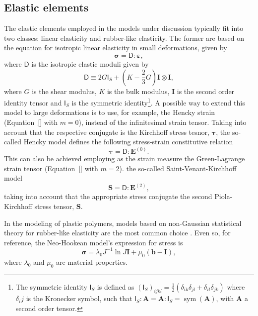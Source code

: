 \subsection{Elastic elements}

The elastic elements employed in the models under discussion typically fit into two classes: linear elasticity and rubber-like elasticity.
The former are based on the equation for isotropic linear elasticity in small deformations, given by
\begin{equation}
	\bm \sigma=\bm{\mathsf D}:\bm \varepsilon,
\end{equation}
where $\bm{\mathsf D}$ is the isotropic elastic moduli given by
\begin{equation}
\bm{\mathsf D}\equiv 2 G \bm{\mathsf I}_S+\left(K-\frac{2}{3} G\right) \mathbf I \otimes \mathbf I ,
\end{equation}
where $G$ is the shear modulus, $K$ is the bulk modulus, $\mathbf I$ is the second order identity tensor and $\bm{\mathsf I}_S$ is the symmetric identity\footnote{The symmetric identity $\bm{\mathsf I}_S$ is defined as $(\bm{\mathsf I}_S)_{ijkl} =\frac{1}{2}(\delta_{ik}\delta_{jl} + \delta_{il}\delta_{jk})$ where $\delta_ij$ is the Kronecker symbol, such that $\bm{\mathsf I}_S: \mathbf A = \mathbf A: \bm{\mathsf I}_S = \operatorname{sym} (\mathbf A)$, with $\mathbf A$ a second order tensor.}.
A possible way to extend this model to large deformations is to use, for example, the Hencky strain (Equation~\eqref{} with $m=0$), instead of the infinitesimal strain tensor.
Taking into account that the respective conjugate is the Kirchhoff stress tesnor, $\bm \tau$, the so-called Hencky model defines the following stress-strain constitutive relation
\begin{equation}
	\label{eq:hencky_model}
	\pmb \tau=\bm{\mathsf D}:\mathbf E^{(0)}.
\end{equation}
This can also be achieved employing as the strain measure the Green-Lagrange strain tensor (Equation~\eqref{} with $m=2$). the so-called Saint-Venant-Kirchhoff model
\begin{equation}
	\label{eq:saint_venant_kirchhoff}
	\mathbf S = \bm{\mathsf D}: \mathbf E^{(2)},
\end{equation}
taking into account that the appropriate stress conjugate the second Piola-Kirchhoff stress tensor, $\mathbf S$.

In the modeling of plastic polymers, models based on non-Gaussian statistical theory for rubber-like elasticity are the most common choice \citep{holzapfelNonlinearSolidMechanics2000}.
Even so, for reference, the Neo-Hookean model's expression for stress is
\begin{equation}
	\bm \sigma = \lambda_0 J^{-1}\ln J \mathbf{I}+\mu_0\left(\mathbf{b}-\mathbf{I}\right),
\end{equation}
where $\lambda_0$ and $\mu_0$ are material properties.

